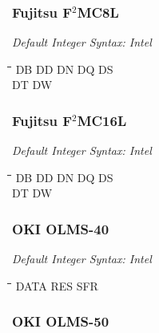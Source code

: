 \subsubsection{Fujitsu F$^{2}$MC8L}

{\em Default Integer Syntax: Intel}

{\tt\begin{tabbing} 
\hspace{3cm}\=\hspace{3cm}\=\hspace{3cm}\=\hspace{3cm}\=\kill
DB         \> DD          \> DN          \> DQ          \> DS \\
DT         \> DW \\
\end{tabbing}}

\subsubsection{Fujitsu F$^{2}$MC16L}

{\em Default Integer Syntax: Intel}

{\tt\begin{tabbing} 
\hspace{3cm}\=\hspace{3cm}\=\hspace{3cm}\=\hspace{3cm}\=\kill
DB         \> DD          \> DN          \> DQ          \> DS \\
DT         \> DW \\
\end{tabbing}}

\subsubsection{OKI OLMS-40}

{\em Default Integer Syntax: Intel}

{\tt\begin{tabbing} 
\hspace{3cm}\=\hspace{3cm}\=\hspace{3cm}\=\hspace{3cm}\=\kill
DATA       \> RES         \> SFR \\
\end{tabbing}}

\subsubsection{OKI OLMS-50}


